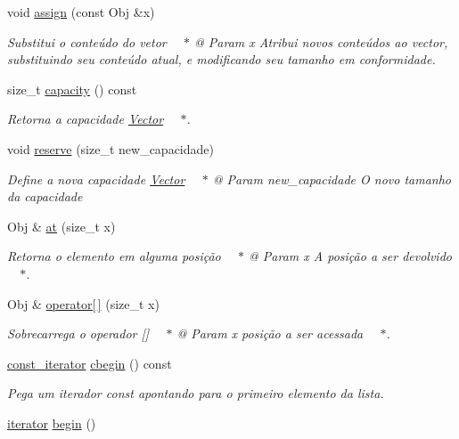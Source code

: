 \begin{DoxyCompactItemize}
void \hyperlink{class_vector_a76ac292de41a52ebc948432c1220d13e}{assign} (const Obj \&x)
\begin{DoxyCompactList}\small\item\em Substitui o conteúdo do vetor   $\ast$ @ Param x Atribui novos conteúdos ao vector, substituindo seu conteúdo atual, e modificando seu tamanho em conformidade. \end{DoxyCompactList}\item 
size\+\_\+t \hyperlink{class_vector_acf2e59a5ce4f1059e08139989ece3e0b}{capacity} () const 
\begin{DoxyCompactList}\small\item\em Retorna a capacidade \hyperlink{class_vector}{Vector}   $\ast$. \end{DoxyCompactList}\item 
void \hyperlink{class_vector_a1a858089a6bc82faffabdeb03386a85f}{reserve} (size\+\_\+t new\+\_\+capacidade)
\begin{DoxyCompactList}\small\item\em Define a nova capacidade \hyperlink{class_vector}{Vector}   $\ast$ @ Param new\+\_\+capacidade O novo tamanho da capacidade    \end{DoxyCompactList}\item 
Obj \& \hyperlink{class_vector_a568255f8d17d285793167b1cee11f926}{at} (size\+\_\+t x)
\begin{DoxyCompactList}\small\item\em Retorna o elemento em alguma posição   $\ast$ @ Param x A posição a ser devolvido   $\ast$. \end{DoxyCompactList}\item 
Obj \& \hyperlink{class_vector_a51289cefc80dbd081f815f30a554b7db}{operator\mbox{[}$\,$\mbox{]}} (size\+\_\+t x)
\begin{DoxyCompactList}\small\item\em Sobrecarrega o operador \mbox{[}\mbox{]}   $\ast$ @ Param x posição a ser acessada   $\ast$. \end{DoxyCompactList}\item 
\hyperlink{class_vector_1_1const__iterator}{const\+\_\+iterator} \hyperlink{class_vector_a66c90ea54c76cf19aee525ed7f4c46dc}{cbegin} () const 
\begin{DoxyCompactList}\small\item\em Pega um iterador const apontando para o primeiro elemento da lista. \end{DoxyCompactList}\item 
\hyperlink{class_vector_1_1iterator}{iterator} \hyperlink{class_vector_a261d7f78f5ac7b890eff45ce86e8d58c}{begin} ()

\end{DoxyCompactItemize}
